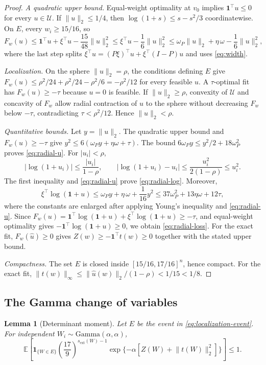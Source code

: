 \documentclass[11pt]{article}
\newtheorem{lemma}{Lemma}
\theoremstyle{definition}
\theoremstyle{remark}
\newcommand{\Ucal}{\mathcal U}
\newcommand{\EE}{\mathbb E}
\newcommand{\one}{\bm 1}
\newcommand{\norm}[1]{\lVert #1\rVert}
\newcommand{\abs}[1]{\lvert #1\rvert}
\newcommand{\sext}{s_{\mathrm{ext}}}
\begin{document}
\begin{proof}
\emph{A quadratic upper bound.}  Equal-weight optimality at $v_0$ implies
$\one^\top u\le0$ for every $u\in\Ucal$.  If $\norm{u}_2\le1/4$, then
$\log(1+s)\le s-s^2/3$ coordinatewise.  On $E$, every $w_i\ge15/16$, so
\[
 F_w(u)\le \one^\top u+\xi^\top u-\frac{15}{48}\norm{u}_2^2
 \le \xi^\top u-\frac16\norm{u}_2^2
 \le \omega_P\norm{u}_2+\eta\,\omega-\frac16\norm{u}_2^2,
\]
where the last step splits
$\xi^\top u=(P\xi)^\top u+\xi^\top(I-P)u$ and uses \eqref{eq:width}.

\emph{Localization.}  On the sphere $\norm{u}_2=\rho$, the conditions
defining $E$ give $F_w(u)\le\rho^2/24+\rho^2/24-\rho^2/6=-\rho^2/12$ for
every feasible $u$.  A $\tau$-optimal fit has $F_w(u)\ge-\tau$ because
$u=0$ is feasible.  If $\norm{u}_2\ge\rho$, convexity of $\Ucal$ and
concavity of $F_w$ allow radial contraction of $u$ to the sphere without
decreasing $F_w$ below $-\tau$, contradicting $\tau<\rho^2/12$.  Hence
$\norm{u}_2<\rho$.

\emph{Quantitative bounds.}  Let $y=\norm{u}_2$.  The quadratic upper bound
and $F_w(u)\ge-\tau$ give $y^2\le6(\omega_Py+\eta\omega+\tau)$.  The bound
$6\omega_Py\le y^2/2+18\omega_P^2$ proves \eqref{eq:radial-u}.  For
$\abs{u_i}<\rho$,
\[
 \abs{\log(1+u_i)}\le\frac{\abs{u_i}}{1-\rho},
 \qquad
 \abs{\log(1+u_i)-u_i}\le\frac{u_i^2}{2(1-\rho)}\le u_i^2.
\]
The first inequality and \eqref{eq:radial-u} prove \eqref{eq:radial-log}.
Moreover,
\[
 \xi^\top\log(\one+u)
 \le \omega_Py+\eta\,\omega+\frac1{16}y^2
 \le37\omega_P^2+13\eta\omega+12\tau,
\]
where the constants are enlarged after applying Young's inequality and
\eqref{eq:radial-u}.  Since
$F_w(u)=\one^\top\log(\one+u)+\xi^\top\log(\one+u)\ge-\tau$, and
equal-weight optimality gives $-\one^\top\log(\one+u)\ge0$, we obtain
\eqref{eq:radial-loss}.  For the exact fit, $F_w(\widehat u)\ge0$ gives
$Z(w)\ge-\one^\top t(w)\ge0$ together with the stated upper bound.

\emph{Compactness.}  The set $E$ is closed inside $[15/16,17/16]^n$, hence
compact.  For the exact fit,
$\norm{t(w)}_\infty\le\norm{\widehat u(w)}_2/(1-\rho)<1/15<1/8$.
\end{proof}

\subsection{The Gamma change of variables}
\label{app:effective-cov}

\begin{lemma}[Determinant moment]
\label{lem:determinant-moment}
Let $E$ be the event in \eqref{eq:localization-event}.  For independent
$W_i\sim\mathrm{Gamma}(\alpha,\alpha)$,
\begin{equation}\label{eq:determinant-moment}
 \EE\left[\bm 1_{\{W\in E\}}
 \left(\frac{17}{9}\right)^{\sext(W)-1}
 \exp\{-\alpha[Z(W)+\norm{t(W)}_2^2]\}\right]\le1.
\end{equation}
\end{lemma}
\end{document}
